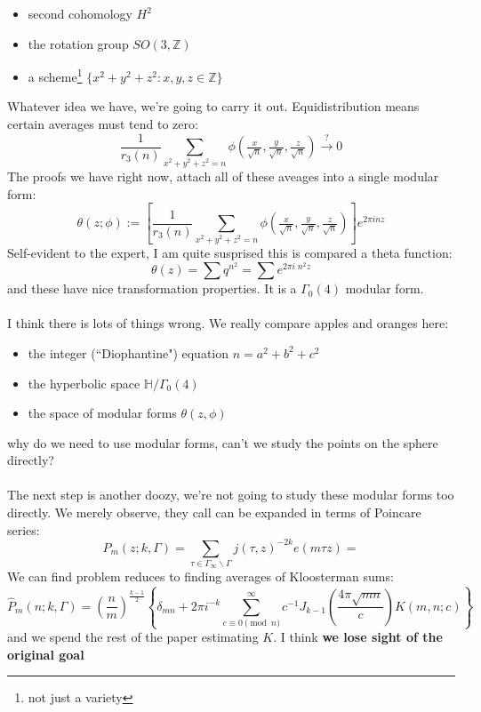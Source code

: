 \documentclass[12pt]{article}
\begin{document}
\begin{itemize}
\item second cohomology $H^2$
\item the rotation group $SO(3, \mathbb{Z})$
\item a scheme\footnote{not just a variety} $\{ x^2 + y^2 + z^2 : x,y,z \in \mathbb{Z} \}$
\end{itemize}
Whatever idea we have, we're going to carry it out.  Equidistribution means certain averages must tend to zero:
$$ \frac{1}{r_3(n)} \sum_{x^2 + y^2 + z^2 = n } \phi( \tfrac{x}{\sqrt{n}},\tfrac{y}{\sqrt{n}},\tfrac{z}{\sqrt{n}}) \stackrel{?}{\to} 0$$
The proofs we have right now, attach all of these aveages into a single modular form:
$$ \theta( z ; \phi) :=  \left[ \frac{1}{r_3(n)} \sum_{x^2 + y^2 + z^2 = n } \phi( \tfrac{x}{\sqrt{n}},\tfrac{y}{\sqrt{n}},\tfrac{z}{\sqrt{n}}) \right] e^{2\pi i nz}  $$
Self-evident to the expert, I am quite susprised this is compared a theta function:
$$ \theta(z) = \sum q^{n^2} = \sum e^{2\pi i \; n^2z} $$
and these have nice transformation properties.  It is a $\Gamma_0(4)$ modular form. \\ \\
I think there is lots of things wrong. We really compare apples and oranges here:
\begin{itemize}
\item the integer (``Diophantine") equation $n = a^2 + b^2 + c^2$
\item the hyperbolic space $\mathbb{H}/\Gamma_0(4)$
\item the space of modular forms $\theta(z, \phi)$
\end{itemize}
why do we need to use modular forms, can't we study the points on the sphere directly? \\ \\
The next step is another doozy, we're not going to study these modular forms too directly.  We merely observe, they call can be expanded in terms of Poincare series:
$$ P_m(z; k, \Gamma) = \sum_{\tau \in \Gamma_\infty \backslash \Gamma } j(\tau, z)^{-2k} e(m \tau z) = $$
We can find problem reduces to finding averages of Kloosterman sums:
$$ \hat{P}_m (n; k , \Gamma) = \left( \frac{n}{m} \right)^{\frac{k-1}{2}} 
\left\{ \delta_{mn} + 2\pi i^{-k} \sum_{c \equiv 0 \pmod n }^\infty 
c^{-1} J_{k-1}\left( \frac{4\pi \sqrt{mn}}{c} \right)  K(m,n;c) \right\} $$
and we spend the rest of the paper estimating $K$.  I think \textbf{we lose sight of the original goal}
\end{document}
